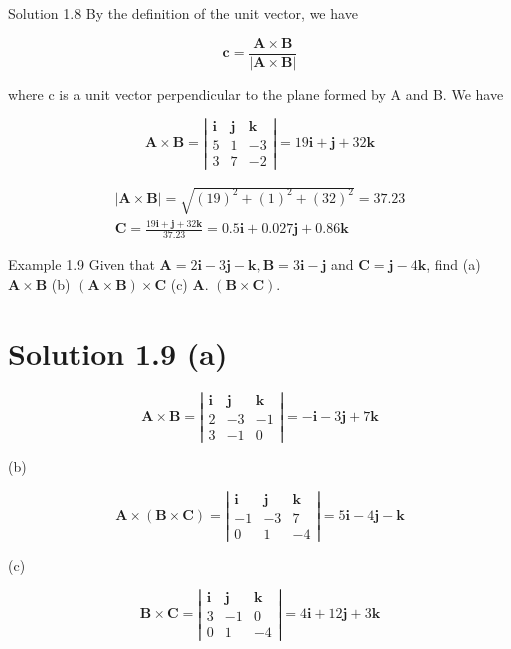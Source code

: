 \documentclass[10pt]{article}
\begin{document}
Solution 1.8 By the definition of the unit vector, we have

$$
\mathbf{c}=\frac{\mathbf{A} \times \mathbf{B}}{|\mathbf{A} \times \mathbf{B}|}
$$

where c is a unit vector perpendicular to the plane formed by A and B. We have

$$
\mathbf{A} \times \mathbf{B}=\left|\begin{array}{lll}
\mathbf{i} & \mathbf{j} & \mathbf{k} \\
5 & 1 & -3 \\
3 & 7 & -2
\end{array}\right|=19 \mathbf{i}+\mathbf{j}+32 \mathbf{k}
$$

$$
\begin{gathered}
|\mathbf{A} \times \mathbf{B}|=\sqrt{(19)^{2}+(1)^{2}+(32)^{2}}=37.23 \\
\mathbf{C}=\frac{19 \mathbf{i}+\mathbf{j}+32 \mathbf{k}}{37.23}=0.5 \mathbf{i}+0.027 \mathbf{j}+0.86 \mathbf{k}
\end{gathered}
$$

Example 1.9 Given that $\mathbf{A}=2 \mathbf{i}-3 \mathbf{j}-\mathbf{k}, \mathbf{B}=3 \mathbf{i}-\mathbf{j}$ and $\mathbf{C}=\mathbf{j}-4 \mathbf{k}$, find (a) $\mathbf{A} \times \mathbf{B}$ (b) $(\mathbf{A} \times \mathbf{B}) \times \mathbf{C}$ (c) $\mathbf{A}$. $(\mathbf{B} \times \mathbf{C})$.

\section*{Solution 1.9 (a)}
$$
\mathbf{A} \times \mathbf{B}=\left|\begin{array}{lll}
\mathbf{i} & \mathbf{j} & \mathbf{k} \\
2 & -3 & -1 \\
3 & -1 & 0
\end{array}\right|=-\mathbf{i}-3 \mathbf{j}+7 \mathbf{k}
$$

(b)

$$
\mathbf{A} \times(\mathbf{B} \times \mathbf{C})=\left|\begin{array}{lll}
\mathbf{i} & \mathbf{j} & \mathbf{k} \\
-1 & -3 & 7 \\
0 & 1 & -4
\end{array}\right|=5 \mathbf{i}-4 \mathbf{j}-\mathbf{k}
$$

(c)

$$
\mathbf{B} \times \mathbf{C}=\left|\begin{array}{lll}
\mathbf{i} & \mathbf{j} & \mathbf{k} \\
3 & -1 & 0 \\
0 & 1 & -4
\end{array}\right|=4 \mathbf{i}+12 \mathbf{j}+3 \mathbf{k}
$$
\end{document}
